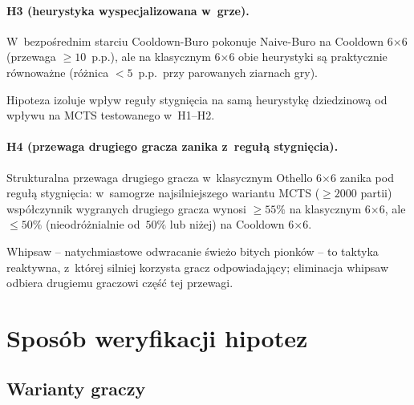 \documentclass[11pt,a4paper]{article}
\begin{document}
\paragraph{H3 (heurystyka wyspecjalizowana w~grze).}
W~bezpośrednim starciu Cooldown-Buro pokonuje Naive-Buro na Cooldown 6$\times$6 (przewaga $\geq 10$~p.p.), ale na klasycznym 6$\times$6 obie heurystyki są praktycznie równoważne (różnica $<5$~p.p.~przy parowanych ziarnach gry).

Hipoteza izoluje wpływ reguły stygnięcia na samą heurystykę dziedzinową od wpływu na MCTS testowanego w~H1--H2.

\paragraph{H4 (przewaga drugiego gracza zanika z~regułą stygnięcia).}
Strukturalna przewaga drugiego gracza w~klasycznym Othello 6$\times$6 zanika pod regułą stygnięcia: w~samogrze najsilniejszego wariantu MCTS ($\geq 2000$ partii) współczynnik wygranych drugiego gracza wynosi $\geq 55\%$ na klasycznym 6$\times$6, ale $\leq 50\%$ (nieodróżnialnie od~$50\%$ lub niżej) na Cooldown 6$\times$6.

Whipsaw -- natychmiastowe odwracanie świeżo bitych pionków -- to taktyka reaktywna, z~której silniej korzysta gracz odpowiadający; eliminacja whipsaw odbiera drugiemu graczowi część tej przewagi.

\section{Sposób weryfikacji hipotez}

\subsection{Warianty graczy}\label{sec:players}
\end{document}
